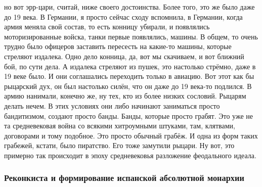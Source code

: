 но вот эрр-цари, считай, ниже своего достоинства. Более того, это же было даже
до 19 века. В Германии, я просто сейчас сходу вспомнила, в Германии, когда армия
меняла свой состав, то есть конницу убирали, и появлялись моторизированные
войска, танки первые появлялись, машины. В общем, то очень трудно было офицеров
заставить пересесть на какие-то машины, которые стреляют издалека. Одно дело
конница, да, вот мы скачиваем, и вот ближний бой, по сути дела. А издалека
стреляют из пушек, это настолько стрёмно, даже в 19 веке было. И они соглашались
переходить только в авиацию. Вот этот как бы рыцарский дух, он был настолько
силён, что он даже до 19 века-то подлился. В армию нанимали, конечно же, ну тех,
кто из более низких сословий. Рыцарям делать нечем. В этих условиях они либо
начинают заниматься просто бандитизмом, создают просто банды. Банды, которые
просто грабят. Это уже не та средневековая война со всякими хитроумными штуками,
там, клятвами, договорами и тому подобное. Это просто обычный грабёж. И одна из
форм таких грабежей, кстати, было пиратство. Его тоже замутили рыцари. Ну вот,
это примерно так происходит в эпоху средневековья разложение феодального идеала.

\subsubsection{Реконкиста и формирование испанской абсолютной монархии}

